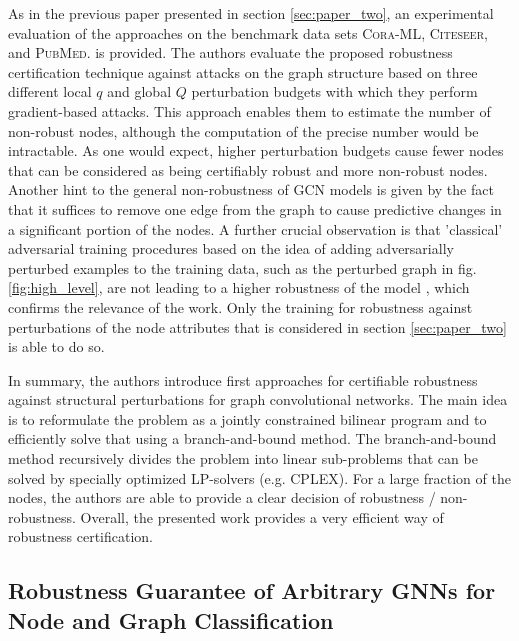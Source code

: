 \documentclass[a4paper,preprint]{sig-alternate}
\begin{document}
As in the previous paper presented in section \ref{sec:paper_two}, an experimental evaluation of the approaches on the benchmark data sets 
\textsc{Cora-ML}, \textsc{Citeseer}, and \textsc{PubMed}. is provided.
The authors evaluate the proposed robustness certification technique against attacks on the graph structure
based on three different local $q$ and global $Q$ perturbation budgets with which they perform gradient-based attacks.
This approach enables them to estimate the number of non-robust nodes, although the computation of the precise number would be intractable. \cite{10.1145/3394486.3403217}
As one would expect, higher perturbation budgets cause fewer nodes that can be considered as being certifiably robust and 
more non-robust nodes. \cite{10.1145/3394486.3403217}
Another hint to the general non-robustness of GCN models is given by the fact that it suffices to remove one edge from the graph
to cause predictive changes in a significant portion of the nodes. \cite{10.1145/3394486.3403217}
A further crucial observation is that 'classical' adversarial training procedures based on the idea of adding adversarially
perturbed examples to the training data, such as the perturbed graph in fig. \ref{fig:high_level}, are not leading to a higher robustness
of the model \cite{10.1145/3394486.3403217}, which confirms the relevance of the work.
Only the training for robustness against perturbations of the node attributes that is considered in section \ref{sec:paper_two} is able to do so.\newline

In summary, the authors introduce first approaches for certifiable robustness against structural perturbations for graph convolutional networks.
The main idea is to reformulate the problem as a jointly constrained bilinear program and to efficiently solve that using a branch-and-bound
method. The branch-and-bound method recursively divides the problem into linear sub-problems that can be solved by specially optimized LP-solvers (e.g. CPLEX).
For a large fraction of the nodes, the authors are able to provide a clear decision of robustness / non-robustness.
Overall, the presented work provides a very efficient way of robustness certification.

\subsection{Robustness Guarantee of Arbitrary GNNs for Node and Graph Classification}
\label{sec:paper_four}
\end{document}
